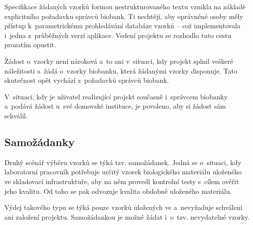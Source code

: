 \documentclass[11pt, draft, oneside]{fithesis2}
\begin{document}
Specifikace žádaných vzorků formou nestrukturovaného textu vznikla na základě explicitního požadavku správců biobank. Ti nechtějí, aby oprávněné osoby měly přístup k~parametrickému prohledávání databáze vzorků -- což implementovala i~jedna z~průběžných verzí aplikace. Vedení projektu se rozhodlo tuto cestu prozatím opustit.

Žádost o~vzorky není nároková a~to ani v~situaci, kdy projekt splnil veškeré náležitosti a~žádá o~vzorky biobanku, která žádanými vzorky disponuje. Tato skutečnost opět vychází z~požadavků správců biobank.

V~situaci, kdy je uživatel realizující projekt současně i~správcem biobanky a~podává žádost u~své domovské instituce, je povoleno, aby si žádost sám schválil.

\subsection{Samožádanky}
Druhý scénář výběru vzorků se týká tzv. samožádanek. Jedná se o~situaci, kdy laboratorní pracovník potřebuje určitý vzorek biologického materiálu uloženého ve skladovací infrastruktuře, aby na něm provedl kontrolní testy s~cílem ověřit jeho kvalitu. Od toho se pak odvozuje kvalita obdobně uloženého materiálu. 

Výdej takového typu se týká pouze vzorků uložených ve  a~nevyžaduje schválení ani založení projektu. Samožádankou je možné žádat i~o~tzv. nevydatelné vzorky. 
\end{document}
